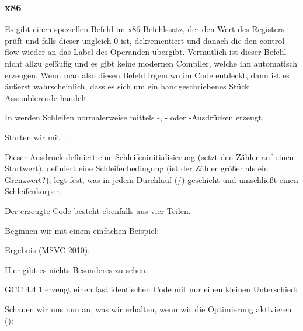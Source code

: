 \subsubsection{x86}

Es gibt einen speziellen \LOOP Befehl im x86 Befehlssatz, der den Wert des
Registers \ECX prüft und falls dieser ungleich 0 ist, dekrementiert und danach
die den control flow wieder an das Label des \LOOP Operanden übergibt.
Vermutlich ist dieser Befehl nicht allzu geläufig und es gibt keine modernen
Compiler, welche ihn automatisch erzeugen. Wenn man also diesen Befehl irgendwo
im Code entdeckt, dann ist es äußerst wahrscheinlich, dass es sich um ein
handgeschriebenes Stück Assemblercode handelt.

\par

In \CCpp werden Schleifen normalerweise mittels -, - oder
-Ausdrücken erzeugt.

Starten wir mit .


Dieser Ausdruck definiert eine Schleifeninitialisierung (setzt den Zähler auf
einen Startwert), definiert eine Schleifenbedingung (ist der Zähler größer als
ein Grenzwert?), legt fest, was in jedem Durchlauf
(/) geschieht und umschließt einen
Schleifenkörper.




Der erzeugte Code besteht ebenfalls aus vier Teilen.

Beginnen wir mit einem einfachen Beispiel:




Ergebnis (MSVC 2010):



Hier gibt es nichts Besonderes zu sehen.

GCC 4.4.1 erzeugt einen fast identischen Code mit nur einen kleinen Unterschied:



Schauen wir uns nun an, was wir erhalten, wenn wir die Optimierung aktivieren
(\TT{\Ox}):

